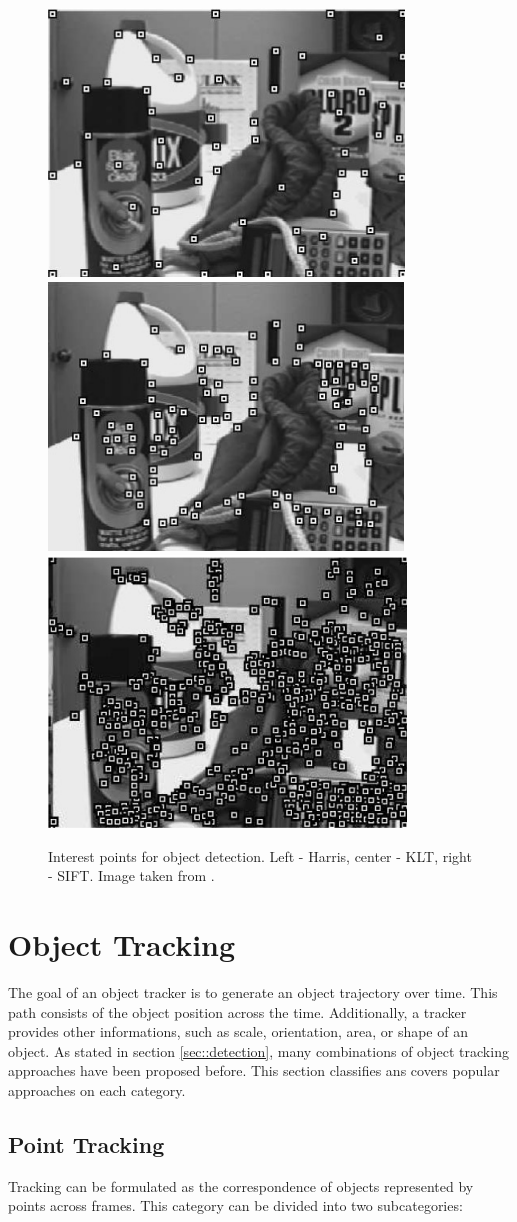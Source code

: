 \begin{figure}[h!!]
\centering
{
\includegraphics[width=0.32\linewidth]{Figures/points/harris.png}
\includegraphics[width=0.32\linewidth]{Figures/points/klt.png}
\includegraphics[width=0.32\linewidth]{Figures/points/sift.png}
}	
\caption{Interest points for object detection. Left - Harris, center - KLT, 
		right - SIFT. Image taken from \cite{Yilmaz2006}.}
\end{figure}

\section{Object Tracking}
\label{sec::tracking}

The goal of an object tracker is to generate an object trajectory over time.
This path consists of the object position across the time. Additionally,
a tracker provides other informations, such as scale, orientation, area, or
shape of an object. As stated in section \ref{sec::detection}, many combinations
of object tracking approaches have been proposed before. This section classifies
ans covers popular approaches on each category.

\subsection{Point Tracking}

Tracking can be formulated as the correspondence of objects represented by points across frames. This category can be divided into two subcategories:

